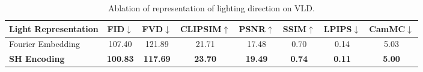 \setlength{\tabcolsep}{1pt}
\begin{table}
\vspace{-5pt}
\scriptsize
\centering
\begin{tabular}{lccccccc}
\toprule
\textbf{Light Representation} & FID$\downarrow$    & FVD$\downarrow$    & CLIPSIM$\uparrow$ & PSNR$\uparrow$  & SSIM$\uparrow$ & LPIPS$\downarrow$ & CamMC$\downarrow$ \\
\midrule
Fourier Embedding                & 107.40          & 121.89          & 21.71            & 17.48          & 0.70          & 0.14           & 5.03           \\
\rowcolor[HTML]{EFEFEF}
\textbf{SH Encoding}             & \textbf{100.83} & \textbf{117.69} & \textbf{23.70}   & \textbf{19.49} & \textbf{0.74} & \textbf{0.11}  & \textbf{5.00} \\
\bottomrule
\end{tabular}
\caption{Ablation of representation of lighting direction on VLD.}
\label{tab:ablation_lighting_representation}
\vspace{-5pt}
\end{table}
